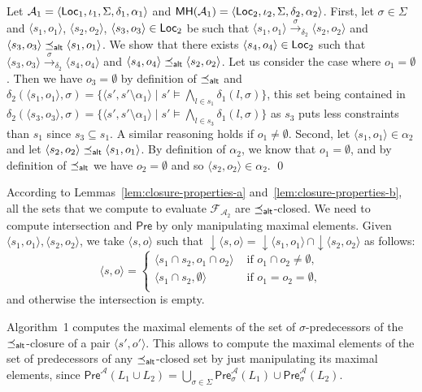 \documentclass{LMCS}
\newcommand{\Pre}{\mathsf{Pre}}
\newcommand{\closure}[1]{\downarrow \!\!#1}
\newcommand{\Loc}{{\sf Loc}}
\newcommand{\tuple}[1]{\langle #1 \rangle}
\newcommand{\A}{\mathcal{A}}
\newcommand{\F}{\mathcal{F}}
\newcommand{\MH}{{\sf MH}}
\begin{document}
\proof 
Let $\A_1=\tuple{\Loc_1, \iota_1, \Sigma, \delta_1, \alpha_1}$ and
  $\MH(\A_1) = \tuple{\Loc_2, \iota_2, \Sigma, \delta_2, \alpha_2}$.
  First, let $\sigma \in \Sigma$ and $\tuple{s_1,o_1}$, $\tuple{s_2,o_2}$, 
 $\tuple{s_3,o_3} \in \Loc_2$ be such that 
 $\tuple{s_1,o_1} \xrightarrow{\sigma}_{\delta_2} \tuple{s_2,o_2}$ and
 $\tuple{s_3,o_3} \preceq_{{\sf alt}} \tuple{s_1,o_1}$.
 We show that there exists $\tuple{s_4,o_4} \in \Loc_2$ such that 
 $\tuple{s_3,o_3} \xrightarrow{\sigma}_{\delta_2} \tuple{s_4,o_4}$
 and $\tuple{s_4,o_4} \preceq_{{\sf alt}} \tuple{s_2,o_2}$. 
 Let us consider the case where $o_1=\emptyset$. Then we have 
  $o_3=\emptyset$ by definition of $\preceq_{{\sf alt}}$ and 
  $\delta_2(\tuple{s_1,o_1},\sigma)=\{ \tuple{s',s' \setminus \alpha_1} \mid 
  s' \models \bigwedge_{l \in s_1} \delta_1(l,\sigma)\}$, 
  this set being contained in $\delta_2(\tuple{s_3,o_3},\sigma)=
  \{ \tuple{s',s' \setminus \alpha_1} \mid s' \models \bigwedge_{l \in s_3}
  \delta_1(l,\sigma) \}$ as $s_3$ puts less constraints than $s_1$ since
  $s_3 \subseteq s_1$. A similar reasoning holds if $o_1 \not=
  \emptyset$. Second, let $\tuple{s_1,o_1} \in \alpha_2$ and let $\tuple{s_2,o_2}
  \preceq_{{\sf alt}} \tuple{s_1,o_1}$. By definition of $\alpha_2$, we know
  that $o_1=\emptyset$, and by definition of $\preceq_{{\sf alt}}$ we have 
  $o_2=\emptyset$ and so $\tuple{s_2,o_2} \in \alpha_2$.
\qed

According to Lemmas~\ref{lem:closure-properties-a} and~\ref{lem:closure-properties-b}, 
all the sets that we compute to evaluate $\F_{\A_2}$ are \mbox{$\preceq_{{\sf alt}}$-closed}.  
We need to compute intersection and $\Pre$ by only manipulating maximal elements. 
Given $\tuple{s_1,o_1}, \tuple{s_2,o_2}$, we take $\tuple{s,o}$ such
that $\closure{\tuple{s,o}}=\closure{\tuple{s_1,o_1}}\, \cap \closure{\tuple{s_2,o_2}}$ as follows:
\begin{equation}\tuple{s,o} = \left\{\begin{array}{ll}\tuple{s_1 \cap s_2,o_1 \cap o_2} & \text{ if } o_1 \cap o_2 \not=\emptyset, \\
					\tuple{s_1 \cap s_2,\emptyset}    & \text{ if } o_1=o_2=\emptyset, \\
\end{array}\right.\label{eq:intersection}\end{equation}
and otherwise the intersection is empty. 

Algorithm~1 computes the maximal elements of the set of
$\sigma$-predecessors of the $\preceq_{{\sf alt}}$-clo\-sure of a pair
$\tuple{s',o'}$. This allows to compute the maximal elements of the
set of predecessors of any $\preceq_{{\sf alt}}$-closed set by just
manipulating its maximal elements, since $\Pre^{\A}(L_1 \cup L_2) =
\bigcup_{\sigma \in \Sigma} \Pre^{\A}_{\sigma}(L_1) \cup
\Pre^{\A}_{\sigma}(L_2)$.
\end{document}
